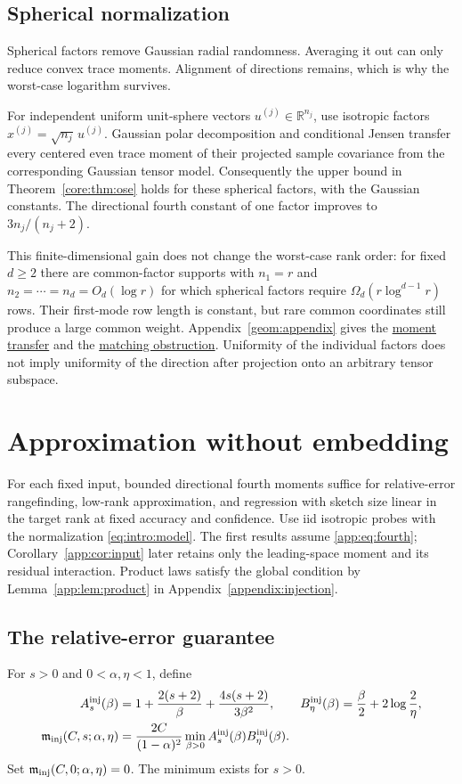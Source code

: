\documentclass[11pt,a4paper]{article}
\theoremstyle{definition}\newtheorem{definition}[theorem]{Definition}
\theoremstyle{remark}\newtheorem{remark}[theorem]{Remark}
\numberwithin{equation}{section}
\newcommand{\R}{\mathbb R}\newcommand{\E}{\mathbb E}\newcommand{\Pp}{\mathbb P}
\begin{document}
\subsection{Spherical normalization}
Spherical factors remove Gaussian radial randomness. Averaging it out
can only reduce convex trace moments. Alignment of directions remains,
which is why the worst-case logarithm survives.

For independent uniform
unit-sphere vectors $u^{(j)}\in\R^{n_j}$, use isotropic factors
$x^{(j)}=\sqrt{n_j}\,u^{(j)}$. Gaussian polar decomposition and conditional
Jensen transfer every centered even trace moment of their projected
sample covariance from the corresponding Gaussian tensor model.
Consequently the upper bound in Theorem~\ref{core:thm:ose} holds for these
spherical factors, with the Gaussian constants. The directional fourth
constant of one factor improves to $3n_j/(n_j+2)$.

This finite-dimensional gain does not change the worst-case rank order:
for fixed $d\ge2$ there are common-factor supports with
$n_1=r$ and $n_2=\cdots=n_d=O_d(\log r)$ for which spherical factors
require $\Omega_d(r\log^{d-1}r)$ rows. Their first-mode row length is
constant, but rare common coordinates still produce a large common
weight. Appendix~\ref{geom:appendix} gives the
\hyperref[proof:spherical-transfer]{moment transfer} and the
\hyperref[proof:spherical-lower]{matching obstruction}.
Uniformity of the individual factors does
not imply uniformity of the direction after projection onto an arbitrary
tensor subspace.


\section{Approximation without embedding}\label{app:sec:relative}
For each fixed input, bounded directional fourth moments suffice for
relative-error rangefinding, low-rank approximation, and regression with
sketch size linear in the target rank at fixed accuracy and confidence.
Use iid isotropic probes with the normalization \eqref{eq:intro:model}.
The first results assume \eqref{app:eq:fourth};
Corollary~\ref{app:cor:input} later retains only the leading-space
moment and its residual interaction. Product laws satisfy the global
condition by Lemma~\ref{app:lem:product} in Appendix~\ref{appendix:injection}.

\subsection{The relative-error guarantee}
For $s>0$ and $0<\alpha,\eta<1$, define
\begin{align}
 A_s^{\rm inj}(\beta)&=1+\frac{2(s+2)}\beta
                  +\frac{4s(s+2)}{3\beta^2},\qquad
 B_\eta^{\rm inj}(\beta)=\frac\beta2+2\log\frac2\eta,
                  \label{app:eq:injection-profile}\\
 \mathfrak m_{\rm inj}(C,s;\alpha,\eta)
  &=\frac{2C}{(1-\alpha)^2}
       \min_{\beta>0} A_s^{\rm inj}(\beta)B_\eta^{\rm inj}(\beta).
                  \label{app:eq:injection-certificate}
\end{align}
Set $\mathfrak m_{\rm inj}(C,0;\alpha,\eta)=0$.
The minimum exists for $s>0$.
\end{document}
